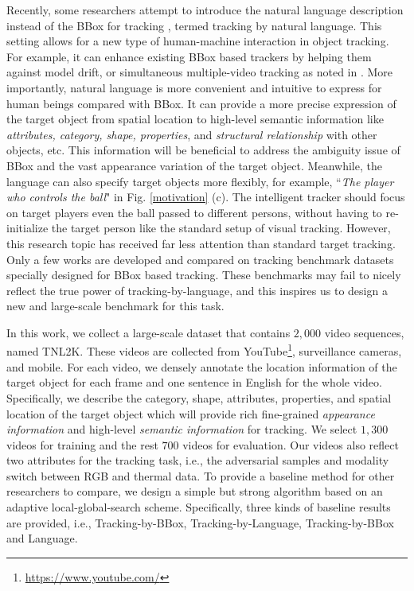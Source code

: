 \documentclass[final]{cvpr}
\begin{document}
Recently, some researchers attempt to introduce the natural language description instead of the BBox for tracking \cite{li2017tracking, wang2018describe, feng2019robust, yang2019grounding}, termed tracking by natural language. This setting allows for a new type of human-machine interaction in object tracking. For example, it can enhance existing BBox based trackers by helping them against model drift, or simultaneous multiple-video tracking as noted in \cite{li2017tracking}. More importantly, natural language is more convenient and intuitive to express for human beings compared with BBox. It can provide a more precise expression of the target object from spatial location to high-level semantic information like \emph{attributes, category, shape, properties}, and \emph{structural relationship} with other objects, etc. This information will be beneficial to address the ambiguity issue of BBox and the vast appearance variation of the target object. Meanwhile, the language can also specify target objects more flexibly, for example, ``\emph{The player who controls the ball}" in Fig. \ref{motivation} (c). The intelligent tracker should focus on target players even the ball passed to different persons, without having to re-initialize the target person like the standard setup of visual tracking. However, this research topic has received far less attention than standard target tracking. Only a few works \cite{li2017tracking, wang2018describe, feng2020langTrackwacv, feng2019robust, yang2019grounding} are developed and compared on tracking benchmark datasets specially designed for BBox based tracking. These benchmarks may fail to nicely reflect the true power of tracking-by-language, and this inspires us to design a new and large-scale benchmark for this task. 



In this work, we collect a large-scale dataset that contains $2,000$ video sequences, named TNL2K. These videos are collected from YouTube\footnote{\url{https://www.youtube.com/}}, surveillance cameras, and mobile. For each video, we densely annotate the location information of the target object for each frame and one sentence in English for the whole video. Specifically, we describe the category, shape, attributes, properties, and spatial location of the target object which will provide rich fine-grained \emph{appearance information} and high-level \emph{semantic information} for tracking. We select $1,300$ videos for training and the rest $700$ videos for evaluation. Our videos also reflect two attributes for the tracking task, i.e., the adversarial samples and modality switch between RGB and thermal data. To provide a baseline method for other researchers to compare, we design a simple but strong algorithm based on an adaptive local-global-search scheme. Specifically, three kinds of baseline results are provided, i.e., Tracking-by-BBox, Tracking-by-Language, Tracking-by-BBox and Language. 
\end{document}
